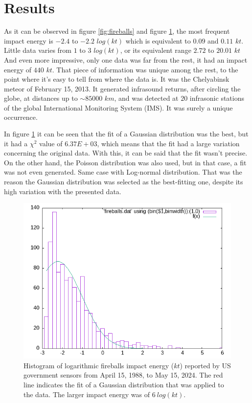 \documentclass[
	a4paper, %
	10pt, %
	unnumberedsections, %
	twoside, %
]{LTJournalArticle}
\begin{document}
\section{Results}

As it can be observed in figure \ref{fig:fireballs} and figure \ref{fig:gaussian}, the most frequent
impact energy is $-2.4$ to $-2.2$ $log(kt)$ which is equivalent to $0.09$ and $0.11$ $kt$. Little
data varies from $1$ to $3$ $log(kt)$, or its equivalent range $2.72$ to $20.01$ $kt$ And even more
impressive, only one data was far from the rest, it had an impact energy of $440$ $kt$. That piece of
information was unique among the rest, to the point where it's easy to tell from where the data is. It
was the Chelyabinsk meteor of February 15, 2013. It generated infrasound returns, after circling the
globe, at distances up to $\sim85000$ $km$, and was detected at $20$ infrasonic stations of the global
International Monitoring System (IMS). \supercite{rusia2013} It was surely a unique occurrence.

In figure \ref{fig:gaussian} it can be seen that the fit of a Gaussian distribution was the best,
but it had a $\chi^2$ value of $6.37E+03$, which means that the fit had a large variation concerning
the original data. With this, it can be said that the fit wasn't precise. On the other hand, the Poisson
distribution was also used, but in that case, a fit was not even generated. Same case with Log-normal
distribution. That was the reason the Gaussian distribution was selected as the best-fitting
one, despite its high variation with the presented data.

\begin{figure}[H] %
	\includegraphics[width=\linewidth]{fit.png}
	\caption{Histogram of logarithmic fireballs impact energy ($kt$) reported by US government sensors from April 15, 1988, to May 15, 2024. The red line indicates the fit of a Gaussian distribution that was applied to the data. The larger impact energy was of $6\:log(kt)$.}
	\label{fig:gaussian}
\end{figure}
\end{document}
